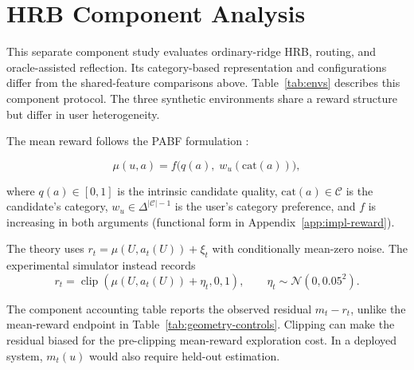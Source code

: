 \documentclass{article} %
\begin{document}
\section{HRB Component Analysis}
\label{app:hrb-components}
\label{sec:exp-setup}

This separate component study evaluates ordinary-ridge HRB, routing, and
oracle-assisted reflection. Its category-based representation and
configurations differ from the shared-feature comparisons above.
Table~\ref{tab:envs} describes this component protocol.
The three synthetic environments share a reward structure but differ in
user heterogeneity.

The mean reward follows the PABF formulation \citep{jin2026personalizing}:

\begin{equation}
\label{eq:exp-mu}
\mu(u,a) = f\bigl(q(a),\; w_u(\mathrm{cat}(a))\bigr),
\end{equation}

where $q(a)\in[0,1]$ is the intrinsic candidate quality, $\mathrm{cat}(a)\in\mathcal{C}$ is the candidate's category, $w_u\in\Delta^{|\mathcal{C}|-1}$ is the user's category preference, and $f$ is increasing in both arguments (functional form in Appendix~\ref{app:impl-reward}).

The theory uses $r_t=\mu(U,a_t(U))+\xi_t$ with conditionally mean-zero noise. The experimental simulator instead records
\begin{equation}
\label{eq:exp-clipped-reward}
r_t=\operatorname{clip}\!\left(\mu(U,a_t(U))+\eta_t,0,1\right),
\qquad
\eta_t\sim\mathcal N(0,0.05^2).
\end{equation}

The component accounting table reports the observed residual \(m_t-r_t\),
unlike the mean-reward endpoint in Table~\ref{tab:geometry-controls}.
Clipping can make the residual biased for the pre-clipping mean-reward
exploration cost. In a deployed system, \(m_t(u)\) would also require
held-out estimation.
\end{document}
